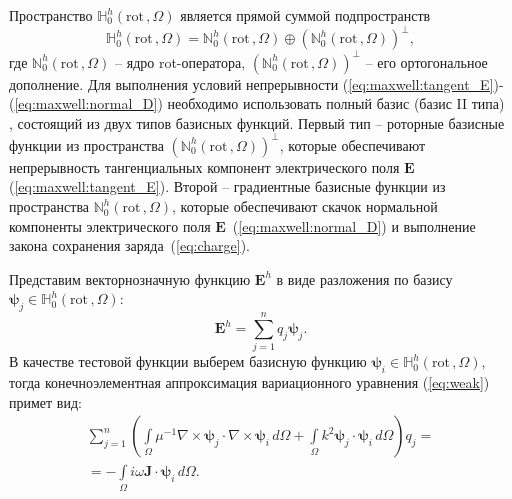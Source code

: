 \documentclass[a4paper,14pt]{article}
\begin{document}
Пространство $\mathbb{H}_{0}^h( \mathrm{rot}\,, \Omega )$ является прямой суммой подпространств~\citep{hiptmair,epov}
\begin{equation}
	\mathbb{H}_{0}^h( \mathrm{rot}\,, \Omega ) = \mathbb{N}_{0}^h( \mathrm{rot}\,, \Omega ) \oplus (\mathbb{N}_{0}^h( \mathrm{rot}\,, \Omega ))^{\bot} ,
	\label{eq:subspaces_sum}
\end{equation}
где $\mathbb{N}_{0}^h( \mathrm{rot}\,, \Omega )$ -- ядро rot-оператора, $(\mathbb{N}_{0}^h( \mathrm{rot}\,, \Omega ))^{\bot}$ -- его ортогональное дополнение. Для выполнения условий непрерывности (\ref{eq:maxwell:tangent_E})-(\ref{eq:maxwell:normal_D}) необходимо использовать полный базис (базис II типа) \citep{webb1993,webb1999,nedelec1980,nedelec1986,epov}, состоящий из двух типов базисных функций. Первый тип -- роторные базисные функции из пространства $(\mathbb{N}_{0}^h( \mathrm{rot}\,, \Omega ))^{\bot}$, которые обеспечивают непрерывность тангенциальных компонент электрического поля $\mathbf{E}$ (\ref{eq:maxwell:tangent_E}). Второй -- градиентные базисные функции из пространства $\mathbb{N}_{0}^h( \mathrm{rot}\,, \Omega )$, которые обеспечивают скачок нормальной компоненты электрического поля $\mathbf{E}$~(\ref{eq:maxwell:normal_D}) и выполнение закона сохранения заряда~(\ref{eq:charge}).

Представим векторнозначную функцию $\mathbf{E}^h$ в виде разложения по базису \linebreak $\boldsymbol{\psi}_j \in \mathbb{H}_{0}^h( \mathrm{rot}\,, \Omega )$:
\begin{equation*}
	\mathbf{E}^h = \sum\limits_{j = 1}^n q_j \boldsymbol{\psi}_j .
\end{equation*}
В качестве тестовой функции выберем базисную функцию $\boldsymbol{\psi}_i \in \mathbb{H}_{0}^h( \mathrm{rot}\,, \Omega )$, тогда конечноэлементная аппроксимация вариационного уравнения (\ref{eq:weak}) примет вид:
\begin{equation}
	\begin{array}{c} { \displaystyle
		\sum\limits_{j = 1}^n \left( \int\limits_\Omega \mu^{-1} \nabla \times \boldsymbol{\psi}_j \cdot \nabla \times \boldsymbol{\psi}_i \,d\Omega + \int\limits_\Omega k^{2} \boldsymbol{\psi}_j \cdot \boldsymbol{\psi}_i \,d\Omega \right) q_j =
	} \\ { \displaystyle
		=  - \int\limits_\Omega i \omega \mathbf{J} \cdot \boldsymbol{\psi}_i \,d\Omega .
	} \end{array}
	\label{eq:weak_discr}
\end{equation}
\end{document}
